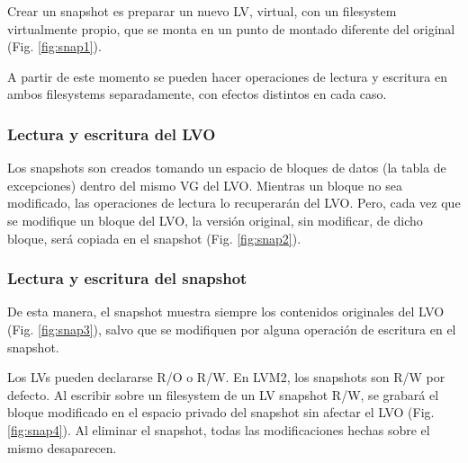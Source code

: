 Crear un snapshot es preparar un nuevo LV, virtual, con un filesystem virtualmente propio, que se monta en un punto de montado diferente del original (Fig. \ref{fig:snap1}). 

 
A partir de este momento se pueden hacer operaciones de lectura y escritura en ambos filesystems separadamente, con efectos distintos en cada caso. 


\subsubsection{Lectura y escritura del LVO}
\label{ssub:lvorw}
Los snapshots son creados tomando un espacio de bloques de datos (la tabla de excepciones) dentro del mismo VG del LVO. Mientras un bloque no sea modificado, las operaciones de lectura lo recuperarán del LVO. Pero, cada vez que se modifique un bloque del LVO, la versión original, sin modificar, de dicho bloque, será copiada en el snapshot (Fig. \ref{fig:snap2}). 

 
\subsubsection{Lectura y escritura del snapshot}
\label{ssub:snaprw}
De esta manera, el snapshot muestra siempre los contenidos originales del LVO (Fig. \ref{fig:snap3}), salvo que se modifiquen por alguna operación de escritura en el snapshot.


Los LVs pueden declararse R/O o R/W. En LVM2, los snapshots son R/W por defecto.  Al escribir sobre un filesystem de un LV snapshot R/W, se grabará el bloque modificado en el espacio privado del snapshot sin afectar el LVO (Fig. \ref{fig:snap4}). Al eliminar el snapshot, todas las modificaciones hechas sobre el mismo desaparecen. 




